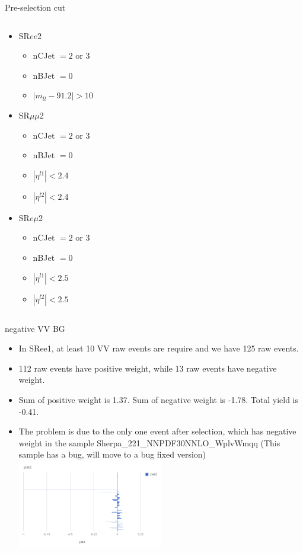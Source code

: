 \documentclass[mathserif,serif]{beamer}
\begin{document}
\begin{frame}{Pre-selection cut}
\begin{columns}
\begin{column}{0.5\textwidth}
\begin{itemize}
\item SR$ee$2
\begin{itemize}
\item nCJet $=2$ or $3$
\item nBJet $=0$
\item $|m_{ll} - 91.2| > 10$
\end{itemize}
\item SR$\mu\mu$2
\begin{itemize}
\item nCJet $=2$ or $3$
\item nBJet $=0$
\item $|\eta^{l1}| < 2.4$
\item $|\eta^{l2}| < 2.4$
\end{itemize}
\item SR$e\mu$2
\begin{itemize}
\item nCJet $=2$ or $3$
\item nBJet $=0$
\item $|\eta^{l1}| < 2.5$
\item $|\eta^{l2}| < 2.5$
\end{itemize}
\end{itemize}

\end{column}
\end{columns}
\end{frame}




\begin{frame}{negative VV BG}
\begin{itemize}
\item In SRee1, at least 10 VV raw events are require and we have 125 raw events.
\item 112 raw events have positive weight, while 13 raw events have negative weight.
\item Sum of positive weight is 1.37. Sum of negative weight is -1.78. Total yield is -0.41.
\item The problem is due to the only one event after selection, which has negative weight in the sample
Sherpa\_221\_NNPDF30NNLO\_WplvWmqq (This sample has a bug, will move to a bug fixed version)
\includegraphics[width=0.5\textwidth]{data/optimization/negativeVV.png}
\end{itemize}
\end{frame}
\end{document}
